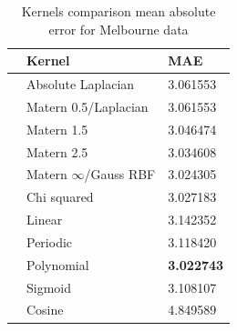 \begin{table}[!htp]
    \caption{Kernels comparison mean absolute error for Melbourne data}
    \label{tab:kernel mae comparison}
    \begin{center}
    \begin{tabular}{lll}
        \toprule
         & Kernel & MAE \\
        \midrule
        & Absolute Laplacian &  3.061553 \\
        & Matern 0.5/Laplacian &  3.061553 \\
        & Matern 1.5 &  3.046474 \\
        & Matern 2.5 &  3.034608 \\
        & Matern $\infty$/Gauss RBF &  3.024305 \\
        & Chi squared &    3.027183    \\
        & Linear &     3.142352\\
        & Periodic  & 3.118420 \\
        & Polynomial &     \textbf{3.022743} \\
        & Sigmoid &      3.108107       \\
        & Cosine &    4.849589 \\
        \bottomrule
        \end{tabular}
    \end{center}
    \end{table}  



